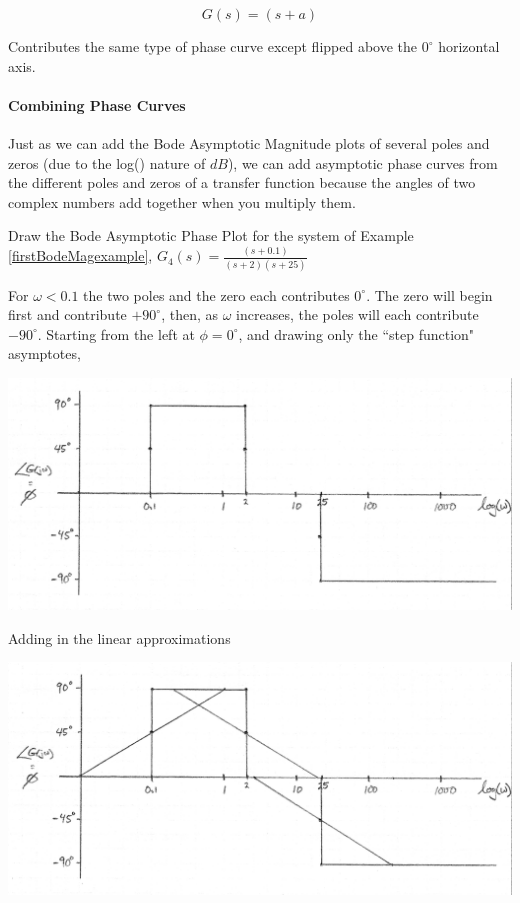 \[
G(s) = (s+a)
\]

Contributes the same type of phase curve except flipped above the $0^\circ$ horizontal axis.

\paragraph{Combining Phase Curves}

Just as we can add the Bode Asymptotic Magnitude plots of several poles and zeros (due to the log() nature of $dB$), we can add asymptotic phase curves from the different poles and zeros of a transfer function because the angles of two complex numbers add together when you multiply them.

\begin{Example}

Draw the Bode Asymptotic Phase Plot for the system of Example \thechapter \ref{firstBodeMagexample},
$G_4(s) = \frac  {(s+0.1)}  {(s+2)(s+25)}$

For $\omega < 0.1$ the two poles and the zero each contributes $0^\circ$.  The zero will begin first and contribute $+90^\circ$, then, as $\omega$ increases, the  poles will each contribute $-90^\circ$.   Starting from the left at $\phi=0^\circ$, and drawing only the ``step function" asymptotes,


\includegraphics[width=5.5in]{figs05/00758a.png}

Adding in the linear approximations

\includegraphics[width=5.5in]{figs05/00759a.png}


\end{Example}
